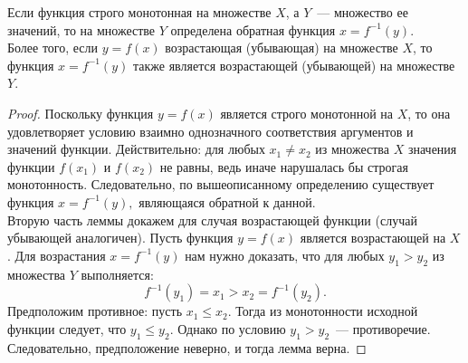 \begin{lemma} \label{6:lemma_inverse_function}
Если функция строго монотонная на множестве \(X\), а \(Y\)~--- множество ее значений,
то на множестве \(Y\) определена обратная функция \(x = f^{-1} (y)\). \\
Более того, если \(y = f(x)\) возрастающая (убывающая) на множестве \(X\),
то функция \(x = f^{-1} (y)\) также является возрастающей (убывающей) на множестве \(Y\).

\begin{proof}
Поскольку функция \(y = f(x)\) является строго монотонной на \(X\),
то она удовлетворяет условию взаимно однозначного соответствия аргументов и значений функции.
Действительно: для любых \(x_{1} \neq x_{2}\) из множества \(X\) значения функции
\(f(x_{1})\) и \(f(x_{2})\) не равны, ведь иначе нарушалась бы строгая монотонность.
Следовательно, по вышеописанному определению существует функция \(x = f^{-1} (y),\)
являющаяся обратной к данной. \\

Вторую часть леммы докажем для случая возрастающей функции (случай убывающей аналогичен).
Пусть функция \(y = f(x)\) является возрастающей на \(X\). Для возрастания \(x = f^{-1} (y)\)
нам нужно доказать, что для любых \(y_{1} > y_{2}\) из множества \(Y\) выполняется:
\[
f^{-1} (y_{1}) = x_{1} > x_{2} = f^{-1} (y_{2}).
\]
Предположим противное: пусть \(x_{1} \leq x_{2}\). Тогда из монотонности исходной функции
следует, что \(y_{1} \leq y_{2}\). Однако по условию \(y_{1} > y_{2}\)~--- противоречие.
Следовательно, предположение неверно, и тогда лемма верна.
\end{proof}
\end{lemma}

